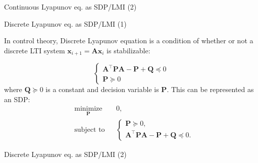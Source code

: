 \documentclass{beamer}
\begin{document}
\begin{frame}{Continuous Lyapunov eq. as SDP/LMI (2)}
\begin{flushleft}



\end{flushleft}
\end{frame}




\begin{frame}{Discrete Lyapunov eq. as SDP/LMI (1)}
\begin{flushleft}

In control theory, Discrete Lyapunov equation is a condition of whether or not a discrete LTI system $\mathbf{x}_{i+1} = \mathbf{A}\mathbf{x}_i$ is stabilizable:

\begin{equation}
    \begin{cases}
        \mathbf{A}^\top \mathbf{P}\mathbf{A} - \mathbf{P} + \mathbf{Q} \preceq 0 \\
        \mathbf{P} \succeq 0
    \end{cases}
\end{equation}
%
where $\mathbf{Q} \succeq 0$ is a constant and decision variable is $\mathbf{P}$. This can be represented as an SDP:
%
\begin{equation}
\begin{aligned}
& \underset{\mathbf{P}}{\text{minimize}}
& & 0, \\
& \text{subject to}
& & \begin{cases}
    \mathbf{P} \succeq 0, \\
    \mathbf{A}^\top \mathbf{P}\mathbf{A} - \mathbf{P} + \mathbf{Q} \preceq 0.
    \end{cases}
\end{aligned}
\end{equation}


\end{flushleft}
\end{frame}



\begin{frame}{Discrete Lyapunov eq. as SDP/LMI (2)}
\begin{flushleft}



\end{flushleft}
\end{frame}
\end{document}
